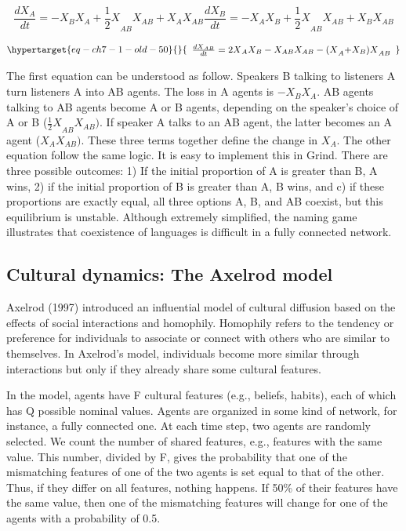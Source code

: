 \documentclass[
  letterpaper,
]{scrbook}
\begin{document}
\[{\frac{{dX}_{A}}{dt} = {- X}_{B}X_{A} + {\frac{1}{2}X}_{AB}X_{AB} + X_{A}X_{AB}
}{\frac{{dX}_{B}}{dt} = {- X}_{A}X_{B} + {\frac{1}{2}X}_{AB}X_{AB} + X_{B}X_{AB}}\]

\begin{equation}\protect\hypertarget{eq-ch7-1-old-50}{}{\begin{array}{r}
\frac{{dX}_{AB}}{dt} = {2X}_{A}X_{B} - X_{AB}X_{AB} - {(X}_{A}{+ X_{B})X}_{AB}
\end{array}}\label{eq-ch7-1-old-50}\end{equation}

The first equation can be understood as follow. Speakers B talking to
listeners A turn listeners A into AB agents. The loss in A agents is
\({- X}_{B}X_{A}\). AB agents talking to AB agents become A or B agents,
depending on the speaker's choice of A or B
(\({\frac{1}{2}X}_{AB}X_{AB})\). If speaker A talks to an AB agent, the
latter becomes an A agent (\(X_{A}X_{AB})\). These three terms together
define the change in \(X_{A}.\) The other equation follow the same
logic. It is easy to implement this in Grind. There are three possible
outcomes: 1) If the initial proportion of A is greater than B, A wins,
2) if the initial proportion of B is greater than A, B wins, and c) if
these proportions are exactly equal, all three options A, B, and AB
coexist, but this equilibrium is unstable. Although extremely
simplified, the naming game illustrates that coexistence of languages is
difficult in a fully connected network.

\hypertarget{cultural-dynamics-the-axelrod-model}{%
\subsection{Cultural dynamics: The Axelrod
model}\label{cultural-dynamics-the-axelrod-model}}

Axelrod (1997) introduced an influential model of cultural diffusion
based on the effects of social interactions and homophily. Homophily
refers to the tendency or preference for individuals to associate or
connect with others who are similar to themselves. In Axelrod's model,
individuals become more similar through interactions but only if they
already share some cultural features.

In the model, agents have F cultural features (e.g., beliefs, habits),
each of which has Q possible nominal values. Agents are organized in
some kind of network, for instance, a fully connected one. At each time
step, two agents are randomly selected. We count the number of shared
features, e.g., features with the same value. This number, divided by F,
gives the probability that one of the mismatching features of one of the
two agents is set equal to that of the other. Thus, if they differ on
all features, nothing happens. If 50\% of their features have the same
value, then one of the mismatching features will change for one of the
agents with a probability of 0.5.
\end{document}
